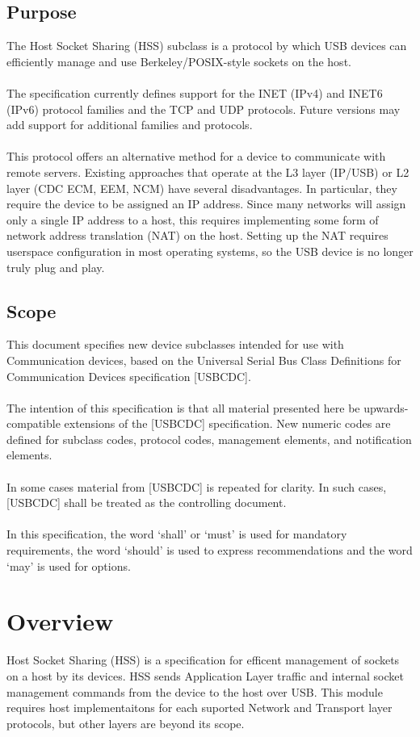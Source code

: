 \documentclass[10pt]{article}
\begin{document}
	\subsection{Purpose}
	The Host Socket Sharing (HSS) subclass is a protocol by which USB devices can efficiently manage and use Berkeley/POSIX-style sockets on the host.\\
	\\
	The specification currently defines support for the INET (IPv4) and INET6 (IPv6) protocol families and the TCP and UDP protocols. Future versions may add support for additional families and protocols.\\
	\\
	This protocol offers an alternative method for a device to communicate with remote servers. Existing approaches that operate at the L3 layer (IP/USB) or L2 layer (CDC ECM, EEM, NCM) have several disadvantages.  In particular, they require the device to be assigned an IP address.  Since many networks will assign only a single IP address to a host, this requires implementing some form of network address translation (NAT) on the host.  Setting up the NAT requires userspace configuration in most operating systems, so the USB device is no longer truly plug and play.
	\subsection{Scope}
	This document specifies new device subclasses intended for use with Communication devices,
	based on the Universal Serial Bus Class Definitions for Communication Devices specification
	[USBCDC]. \\
	\\
	The intention of this specification is that all material presented here be upwards-compatible
	extensions of the [USBCDC] specification. New numeric codes are defined for subclass codes,
	protocol codes, management elements, and notification elements. \\
	\\
	In some cases material from [USBCDC] is repeated for clarity. In such cases, [USBCDC] shall be
	treated as the controlling document. \\
	\\
	In this specification, the word ‘shall’ or ‘must’ is used for mandatory requirements, the word
	‘should’ is used to express recommendations and the word ‘may’ is used for options. 
	\section{Overview}
	Host Socket Sharing (HSS) is a specification for efficent management of sockets on a host by its devices. HSS sends Application Layer traffic and internal socket management commands from the device to the host over USB. This module requires host implementaitons for each suported Network and Transport layer protocols, but other layers are beyond its scope.
\end{document}
